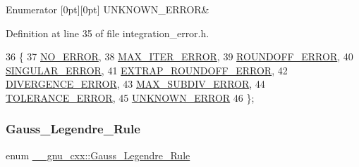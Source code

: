 \begin{DoxyEnumFields}{Enumerator}
[0pt][0pt]{}\mbox{\label{namespace____gnu__cxx_ad6c62dd86a596716cece6ac2d4cfd4b3a7c57c614db2692fad0a19cb2ded33ed3}} 
U\+N\+K\+N\+O\+W\+N\+\_\+\+E\+R\+R\+OR&\\
\hline

\end{DoxyEnumFields}


Definition at line 35 of file integration\+\_\+error.\+h.


\begin{DoxyCode}
36   \{
37     \hyperlink{namespace____gnu__cxx_ad6c62dd86a596716cece6ac2d4cfd4b3ac31eecc280b10dec2efb4a2216ccc2e0}{NO\_ERROR},
38     \hyperlink{namespace____gnu__cxx_ad6c62dd86a596716cece6ac2d4cfd4b3a420d46d10205dd953d0ccce5323afc4c}{MAX\_ITER\_ERROR},
39     \hyperlink{namespace____gnu__cxx_ad6c62dd86a596716cece6ac2d4cfd4b3a29574de87143c7715e9a138d7340e8ae}{ROUNDOFF\_ERROR},
40     \hyperlink{namespace____gnu__cxx_ad6c62dd86a596716cece6ac2d4cfd4b3a8e955ea89d59c116d92f16f345620d04}{SINGULAR\_ERROR},
41     \hyperlink{namespace____gnu__cxx_ad6c62dd86a596716cece6ac2d4cfd4b3ac3b74f0b40291f29a3cb3a188412308b}{EXTRAP\_ROUNDOFF\_ERROR},
42     \hyperlink{namespace____gnu__cxx_ad6c62dd86a596716cece6ac2d4cfd4b3a5a36b63b8fa7c921d9332c69416c2686}{DIVERGENCE\_ERROR},
43     \hyperlink{namespace____gnu__cxx_ad6c62dd86a596716cece6ac2d4cfd4b3a4c1e6a4f8a49af2eae50e4bf6f93e016}{MAX\_SUBDIV\_ERROR},
44     \hyperlink{namespace____gnu__cxx_ad6c62dd86a596716cece6ac2d4cfd4b3ab7427fd44a0ed217814ca07b9b5aba07}{TOLERANCE\_ERROR},
45     \hyperlink{namespace____gnu__cxx_ad6c62dd86a596716cece6ac2d4cfd4b3a7c57c614db2692fad0a19cb2ded33ed3}{UNKNOWN\_ERROR}
46   \};
\end{DoxyCode}
\mbox{\label{namespace____gnu__cxx_a0fb9cd1b8cad919613d85632c52d7b6c}} 
\subsubsection{\texorpdfstring{Gauss\+\_\+\+Legendre\+\_\+\+Rule}{Gauss\_Legendre\_Rule}}
{\footnotesize\ttfamily enum \hyperlink{namespace____gnu__cxx_a0fb9cd1b8cad919613d85632c52d7b6c}{\+\_\+\+\_\+gnu\+\_\+cxx\+::\+Gauss\+\_\+\+Legendre\+\_\+\+Rule}}

